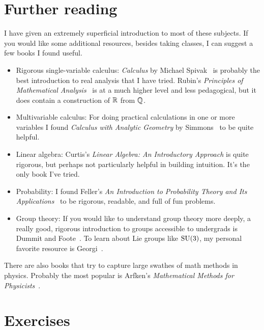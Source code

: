 \section{Further reading}

I have given an extremely superficial introduction to most of these subjects. If
you would like some additional resources, besides taking classes, I can suggest
a few books I found useful.
\begin{itemize}
  \item Rigorous single-variable calculus: 
{\it Calculus} by Michael Spivak~\cite{spivak08} is probably the best
introduction to real analysis that I have tried.
Rubin's {\it Principles of Mathematical Analysis}~\cite{rudin1976principles} is
at a much higher level and less pedagogical, but it does contain a construction
of $\mathbb{R}$ from $\mathbb{Q}$.
  \item Multivariable calculus: For doing practical calculations in one or more
variables I found 
{\it Calculus with Analytic Geometry} by Simmons~\cite{simmons1995calculus}
to be quite helpful.
  \item Linear algebra: Curtis's
{\it Linear Algebra: An Introductory Approach} is quite rigorous, but perhaps
not particularly helpful in building intuition. It's the only book I've tried. 
  \item Probability: I found
Feller's {\it An Introduction to Probability Theory and Its 
Applications}~\cite{feller1}
to be rigorous, readable, and full of fun problems.
  \item Group theory:
If you would like to understand group theory more deeply,
a really good, rigorous introduction to groups accessible to undergrads is 
Dummit and Foote~\cite{dummit_abstract_2004}. To learn about Lie groups
like $\operatorname{SU}(3)$, my personal favorite resource is Georgi~\cite{georgi_lie_1999}.
\end{itemize}
There are also books that try to capture large swathes of math methods in
physics. Probably the most popular is Arfken's {\it Mathematical Methods for
Physicists}~\cite{garfken67:math}.

\section*{Exercises}

